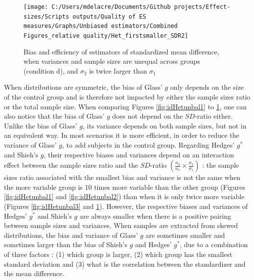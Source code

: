 \documentclass[
  english,
  man,floatsintext]{apa6}
\begin{document}
\newpage
\begin{landscape}

\begin{figure}

{\centering \texttt{[image: C:/Users/mdelacre/Documents/Github projects/Effect-sizes/Scripts outputs/Quality of ES measures/Graphs/Unbiased estimators/Combined Figures\_relative quality/Het\_firstsmaller\_SDR2]} 

}

\caption{Bias and efficiency of estimators of standardized mean difference, when variances and sample sizes are unequal across groups (condition d), and $\sigma_2$ is twice larger than $\sigma_1$}\label{fig:idHetunbal4}
\end{figure}

\end{landscape}
\newpage

When distributions are symmetric, the bias of Glass' \(g\) only depends on the size of the control group and is therefore not impacted by either the sample sizes ratio or the total sample size. When comparing Figures \ref{fig:idHetunbal1} to \ref{fig:idHetunbal4}, one can also notice that the bias of Glass' \(g\) does not depend on the \(SD\)-ratio either. Unlike the bias of Glass' \(g\), its variance depends on both sample sizes, but not in an equivalent way. In most scenarios it is more efficient, in order to reduce the variance of Glass' \(g\), to add subjects in the control group. Regarding Hedges' \(g^*\) and Shieh's \(g\), their respective biases and variances depend on an interaction effect between the sample sizes ratio and the \(SD\)-ratio \(\left( \frac{n_2}{n_1} \times \frac{\sigma_2}{\sigma_1} \right)\) : the sample sizes ratio associated with the smallest bias and variance is not the same when the more variable group is 10 times more variable than the other group (Figures \ref{fig:idHetunbal1} and \ref{fig:idHetunbal2}) than when it is only twice more variable (Figures \ref{fig:idHetunbal3} and \ref{fig:idHetunbal4}). However, the respective biases and variances of Hedges' \(g^*\) and Shieh's \(g\) are always smaller when there is a positive pairing between sample sizes and variances. When samples are extracted from skewed distributions, the bias and variance of Glass' \(g\) are sometimes smaller and sometimes larger than the bias of Shieh's \(g\) and Hedges' \(g^*\), due to a combination of three factors : (1) which group is larger, (2) which group has the smallest standard deviation and (3) what is the correlation between the standardizer and the mean difference.
\end{document}
